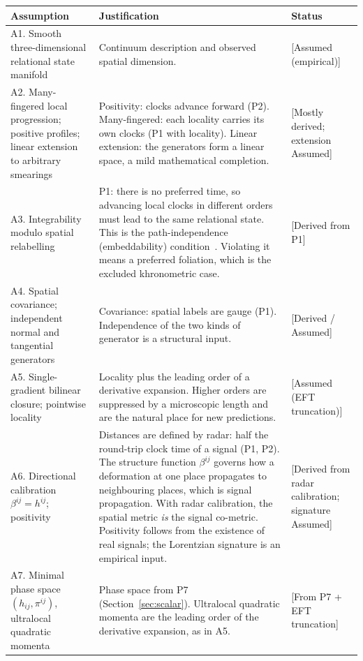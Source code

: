 \documentclass[11pt]{article}
\newcommand{\st}[1]{\textsf{\small[#1]}}
\theoremstyle{plain}
\theoremstyle{definition}
\theoremstyle{remark}
\begin{document}
\begin{longtable}{@{}p{}p{}p{}@{}}
\toprule
Assumption & Justification & Status \\
\midrule
A1. Smooth three-dimensional relational state manifold & Continuum description and observed spatial dimension. & \st{Assumed (empirical)} \\
A2. Many-fingered local progression; positive profiles; linear extension to arbitrary smearings & Positivity: clocks advance forward (P2). Many-fingered: each locality carries its own clocks (P1 with locality). Linear extension: the generators form a linear space, a mild mathematical completion. & \st{Mostly derived; extension Assumed} \\
A3. Integrability modulo spatial relabelling & P1: there is no preferred time, so advancing local clocks in different orders must lead to the same relational state. This is the path-independence (embeddability) condition~\cite{Teitelboim1973,HKT1976}. Violating it means a preferred foliation, which is the excluded khronometric case. & \st{Derived from P1} \\
A4. Spatial covariance; independent normal and tangential generators & Covariance: spatial labels are gauge (P1). Independence of the two kinds of generator is a structural input. & \st{Derived / Assumed} \\
A5. Single-gradient bilinear closure; pointwise locality & Locality plus the leading order of a derivative expansion. Higher orders are suppressed by a microscopic length and are the natural place for new predictions. & \st{Assumed (EFT truncation)} \\
A6. Directional calibration $\beta^{ij}=h^{ij}$; positivity & Distances are defined by radar: half the round-trip clock time of a signal (P1, P2). The structure function $\beta^{ij}$ governs how a deformation at one place propagates to neighbouring places, which is signal propagation. With radar calibration, the spatial metric \emph{is} the signal co-metric. Positivity follows from the existence of real signals; the Lorentzian signature is an empirical input. & \st{Derived from radar calibration; signature Assumed} \\
A7. Minimal phase space $(h_{ij},\pi^{ij})$, ultralocal quadratic momenta & Phase space from P7 (Section~\ref{sec:scalar}). Ultralocal quadratic momenta are the leading order of the derivative expansion, as in A5. & \st{From P7 + EFT truncation} \\
\bottomrule
\end{longtable}
\end{document}
